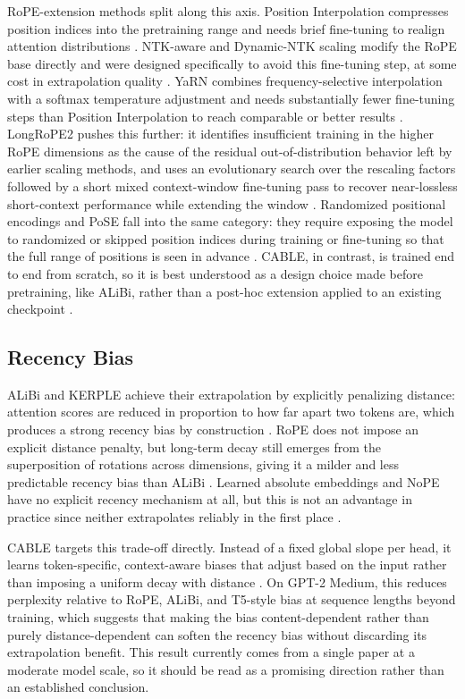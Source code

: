 \documentclass[conference]{IEEEtran}
\begin{document}
RoPE-extension methods split along this axis. Position Interpolation compresses position indices into the pretraining range and needs brief fine-tuning to realign attention distributions \cite{chen2023}. NTK-aware and Dynamic-NTK scaling modify the RoPE base directly and were designed specifically to avoid this fine-tuning step, at some cost in extrapolation quality \cite{zhao2024survey}. YaRN combines frequency-selective interpolation with a softmax temperature adjustment and needs substantially fewer fine-tuning steps than Position Interpolation to reach comparable or better results \cite{peng2023yarn}. LongRoPE2 pushes this further: it identifies insufficient training in the higher RoPE dimensions as the cause of the residual out-of-distribution behavior left by earlier scaling methods, and uses an evolutionary search over the rescaling factors followed by a short mixed context-window fine-tuning pass to recover near-lossless short-context performance while extending the window \cite{shang2025longrope2}. Randomized positional encodings and PoSE fall into the same category: they require exposing the model to randomized or skipped position indices during training or fine-tuning so that the full range of positions is seen in advance \cite{ruoss2023,zhao2024survey}. CABLE, in contrast, is trained end to end from scratch, so it is best understood as a design choice made before pretraining, like ALiBi, rather than a post-hoc extension applied to an existing checkpoint \cite{veisi2025cable}.

\subsection{Recency Bias}

ALiBi and KERPLE achieve their extrapolation by explicitly penalizing distance: attention scores are reduced in proportion to how far apart two tokens are, which produces a strong recency bias by construction \cite{press2022,chi2022}. RoPE does not impose an explicit distance penalty, but long-term decay still emerges from the superposition of rotations across dimensions, giving it a milder and less predictable recency bias than ALiBi \cite{su2024roformer,sun2022lex}. Learned absolute embeddings and NoPE have no explicit recency mechanism at all, but this is not an advantage in practice since neither extrapolates reliably in the first place \cite{press2022,kazemnejad2023}.

CABLE targets this trade-off directly. Instead of a fixed global slope per head, it learns token-specific, context-aware biases that adjust based on the input rather than imposing a uniform decay with distance \cite{veisi2025cable}. On GPT-2 Medium, this reduces perplexity relative to RoPE, ALiBi, and T5-style bias at sequence lengths beyond training, which suggests that making the bias content-dependent rather than purely distance-dependent can soften the recency bias without discarding its extrapolation benefit. This result currently comes from a single paper at a moderate model scale, so it should be read as a promising direction rather than an established conclusion.
\end{document}
